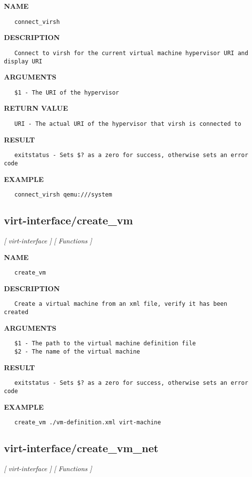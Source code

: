 \label{ch:robo57}
\label{ch:virt_interface_connect_virsh}
\textbf{NAME}
\begin{verbatim}
   connect_virsh
\end{verbatim}
\textbf{DESCRIPTION}
\begin{verbatim}
   Connect to virsh for the current virtual machine hypervisor URI and display URI
\end{verbatim}
\textbf{ARGUMENTS}
\begin{verbatim}
   $1 - The URI of the hypervisor
\end{verbatim}
\textbf{RETURN VALUE}
\begin{verbatim}
   URI - The actual URI of the hypervisor that virsh is connected to
\end{verbatim}
\textbf{RESULT}
\begin{verbatim}
   exitstatus - Sets $? as a zero for success, otherwise sets an error code
\end{verbatim}
\textbf{EXAMPLE}
\begin{verbatim}
   connect_virsh qemu:///system
\end{verbatim}
\newpage
\subsection{virt-interface/create\_vm}
\textsl{[ virt-interface ]}
\textsl{[ Functions ]}

\label{ch:robo58}
\label{ch:virt_interface_create_vm}
\textbf{NAME}
\begin{verbatim}
   create_vm
\end{verbatim}
\textbf{DESCRIPTION}
\begin{verbatim}
   Create a virtual machine from an xml file, verify it has been created 
\end{verbatim}
\textbf{ARGUMENTS}
\begin{verbatim}
   $1 - The path to the virtual machine definition file
   $2 - The name of the virtual machine
\end{verbatim}
\textbf{RESULT}
\begin{verbatim}
   exitstatus - Sets $? as a zero for success, otherwise sets an error code
\end{verbatim}
\textbf{EXAMPLE}
\begin{verbatim}
   create_vm ./vm-definition.xml virt-machine
\end{verbatim}
\newpage
\subsection{virt-interface/create\_vm\_net}
\textsl{[ virt-interface ]}
\textsl{[ Functions ]}


